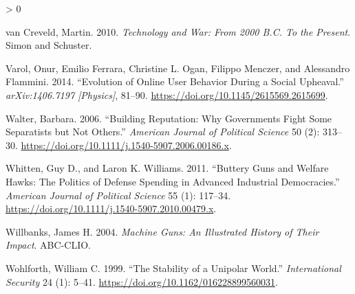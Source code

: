 \documentclass[
]{article}
\newlength{\cslhangindent}
\newenvironment{CSLReferences}[2] %
 {%
  \setlength{\parindent}{0pt}
  \ifodd #1 \everypar{\setlength{\hangindent}{\cslhangindent}}\ignorespaces\fi
  \ifnum #2 > 0
  \setlength{\parskip}{#2\baselineskip}
  \fi
 }%
 {}
\begin{document}
\begin{CSLReferences}{1}{0}
\leavevmode\hypertarget{ref-vancreveld_technologywar2000_2010}{}%
van Creveld, Martin. 2010. \emph{Technology and {War}: {From} 2000 {B}.{C}. To the {Present}}. {Simon and Schuster}.

\leavevmode\hypertarget{ref-varol_evolutiononlineuser_2014}{}%
Varol, Onur, Emilio Ferrara, Christine L. Ogan, Filippo Menczer, and Alessandro Flammini. 2014. {``Evolution of {Online User Behavior During} a {Social Upheaval}.''} \emph{arXiv:1406.7197 {[}Physics{]}}, 81--90. \url{https://doi.org/10.1145/2615569.2615699}.

\leavevmode\hypertarget{ref-walter_buildingreputationwhy_2006}{}%
Walter, Barbara. 2006. {``Building {Reputation}: {Why Governments Fight Some Separatists} but {Not Others}.''} \emph{American Journal of Political Science} 50 (2): 313--30. \url{https://doi.org/10.1111/j.1540-5907.2006.00186.x}.

\leavevmode\hypertarget{ref-whitten_butterygunswelfare_2011}{}%
Whitten, Guy D., and Laron K. Williams. 2011. {``Buttery {Guns} and {Welfare Hawks}: {The Politics} of {Defense Spending} in {Advanced Industrial Democracies}.''} \emph{American Journal of Political Science} 55 (1): 117--34. \url{https://doi.org/10.1111/j.1540-5907.2010.00479.x}.

\leavevmode\hypertarget{ref-willbanks_machinegunsillustrated_2004}{}%
Willbanks, James H. 2004. \emph{Machine {Guns}: {An Illustrated History} of {Their Impact}}. {ABC-CLIO}.

\leavevmode\hypertarget{ref-wohlforth_stabilityunipolarworld_1999}{}%
Wohlforth, William C. 1999. {``The {Stability} of a {Unipolar World}.''} \emph{International Security} 24 (1): 5--41. \url{https://doi.org/10.1162/016228899560031}.

\end{CSLReferences}
\end{document}
